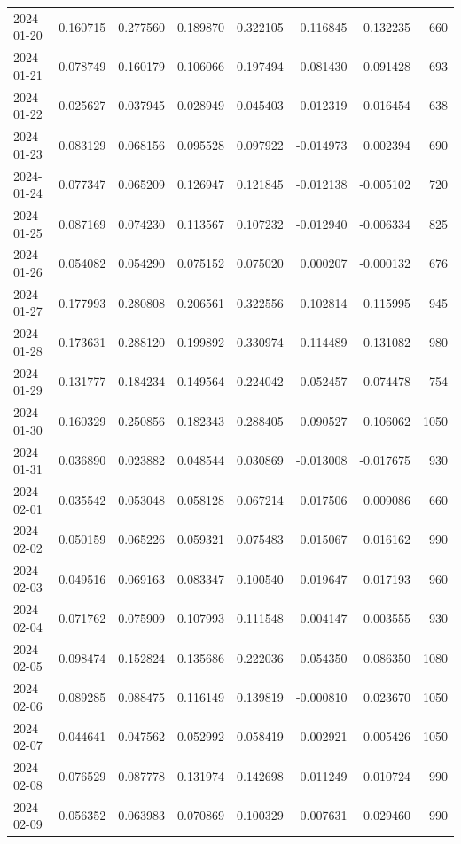 \begin{tabular}{lrrrrrrr}
2024-01-20 & 0.160715 & 0.277560 & 0.189870 & 0.322105 & 0.116845 & 0.132235 & 660 \\
2024-01-21 & 0.078749 & 0.160179 & 0.106066 & 0.197494 & 0.081430 & 0.091428 & 693 \\
2024-01-22 & 0.025627 & 0.037945 & 0.028949 & 0.045403 & 0.012319 & 0.016454 & 638 \\
2024-01-23 & 0.083129 & 0.068156 & 0.095528 & 0.097922 & -0.014973 & 0.002394 & 690 \\
2024-01-24 & 0.077347 & 0.065209 & 0.126947 & 0.121845 & -0.012138 & -0.005102 & 720 \\
2024-01-25 & 0.087169 & 0.074230 & 0.113567 & 0.107232 & -0.012940 & -0.006334 & 825 \\
2024-01-26 & 0.054082 & 0.054290 & 0.075152 & 0.075020 & 0.000207 & -0.000132 & 676 \\
2024-01-27 & 0.177993 & 0.280808 & 0.206561 & 0.322556 & 0.102814 & 0.115995 & 945 \\
2024-01-28 & 0.173631 & 0.288120 & 0.199892 & 0.330974 & 0.114489 & 0.131082 & 980 \\
2024-01-29 & 0.131777 & 0.184234 & 0.149564 & 0.224042 & 0.052457 & 0.074478 & 754 \\
2024-01-30 & 0.160329 & 0.250856 & 0.182343 & 0.288405 & 0.090527 & 0.106062 & 1050 \\
2024-01-31 & 0.036890 & 0.023882 & 0.048544 & 0.030869 & -0.013008 & -0.017675 & 930 \\
2024-02-01 & 0.035542 & 0.053048 & 0.058128 & 0.067214 & 0.017506 & 0.009086 & 660 \\
2024-02-02 & 0.050159 & 0.065226 & 0.059321 & 0.075483 & 0.015067 & 0.016162 & 990 \\
2024-02-03 & 0.049516 & 0.069163 & 0.083347 & 0.100540 & 0.019647 & 0.017193 & 960 \\
2024-02-04 & 0.071762 & 0.075909 & 0.107993 & 0.111548 & 0.004147 & 0.003555 & 930 \\
2024-02-05 & 0.098474 & 0.152824 & 0.135686 & 0.222036 & 0.054350 & 0.086350 & 1080 \\
2024-02-06 & 0.089285 & 0.088475 & 0.116149 & 0.139819 & -0.000810 & 0.023670 & 1050 \\
2024-02-07 & 0.044641 & 0.047562 & 0.052992 & 0.058419 & 0.002921 & 0.005426 & 1050 \\
2024-02-08 & 0.076529 & 0.087778 & 0.131974 & 0.142698 & 0.011249 & 0.010724 & 990 \\
2024-02-09 & 0.056352 & 0.063983 & 0.070869 & 0.100329 & 0.007631 & 0.029460 & 990 \\

\end{tabular}
